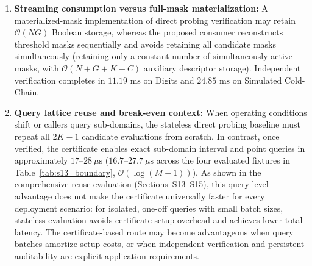 \documentclass[11pt,a4paper]{article}
\theoremstyle{plain}
\theoremstyle{definition}
\theoremstyle{remark}
\begin{document}
\begin{enumerate}
\item \textbf{Streaming consumption versus full-mask materialization:} A materialized-mask implementation of direct probing verification may retain $\mathcal{O}(NG)$ Boolean storage, whereas the proposed consumer reconstructs threshold masks sequentially and avoids retaining all candidate masks simultaneously (retaining only a constant number of simultaneously active masks, with $\mathcal{O}(N + G + K + C)$ auxiliary descriptor storage). Independent verification completes in $11.19\text{ ms}$ on Digits and $24.85\text{ ms}$ on Simulated Cold-Chain.
\item \textbf{Query lattice reuse and break-even context:} When operating conditions shift or callers query sub-domains, the stateless direct probing baseline must repeat all $2K-1$ candidate evaluations from scratch. In contrast, once verified, the certificate enables exact sub-domain interval and point queries in approximately $17\text{--}28\ \mu\text{s}$ ($16.7\text{--}27.7\ \mu\text{s}$ across the four evaluated fixtures in Table~\ref{tab:s13_boundary}, $\mathcal{O}(\log(M+1))$). As shown in the comprehensive reuse evaluation (Sections~S13--S15), this query-level advantage does not make the certificate universally faster for every deployment scenario: for isolated, one-off queries with small batch sizes, stateless evaluation avoids certificate setup overhead and achieves lower total latency. The certificate-based route may become advantageous when query batches amortize setup costs, or when independent verification and persistent auditability are explicit application requirements.
\end{enumerate}
\end{document}
